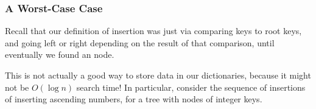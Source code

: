 \documentclass[aspectratio=169]{beamer}
\begin{document}
\begin{frame}[fragile]
  \frametitle{A Worst-Case Case}

  Recall that our definition of insertion was just via comparing keys to
  root keys, and going left or right depending on the result of that comparison,
  until eventually we found an  node.

  \pause
  \vspace{\fill}

  This is not actually a good way to store data in our dictionaries, because it
  might not be $O(\log n)$ search time! In particular, consider the sequence
  of insertions of inserting ascending numbers, for a tree with nodes of integer
  keys.

  \pause
  \vspace{\fill}


\end{frame}
\end{document}
